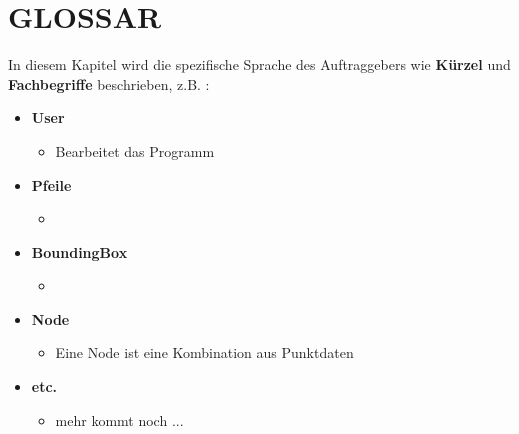 	\section{\Large GLOSSAR}
	In diesem Kapitel wird die spezifische Sprache des Auftraggebers wie \textbf{ Kürzel } und \textbf{ Fachbegriffe } beschrieben, z.B. :
	\begin{itemize}
		\item \textbf{ User }
		\begin{itemize}
			\item Bearbeitet das Programm
		\end{itemize}
	\end{itemize}
	\begin{itemize}
		\item \textbf{ Pfeile }
		\begin{itemize}
			\item 
		\end{itemize}
	\end{itemize}
	\begin{itemize}
		\item \textbf{ BoundingBox }
		\begin{itemize}
			\item 
		\end{itemize}
	\end{itemize}
	\begin{itemize}
		\item \textbf{ Node }
		\begin{itemize}
			\item Eine Node ist eine Kombination aus Punktdaten
		\end{itemize}
	\end{itemize}
	\begin{itemize}
		\item \textbf{ etc. }
		\begin{itemize}
			\item mehr kommt noch ...
		\end{itemize}
	\end{itemize}

		